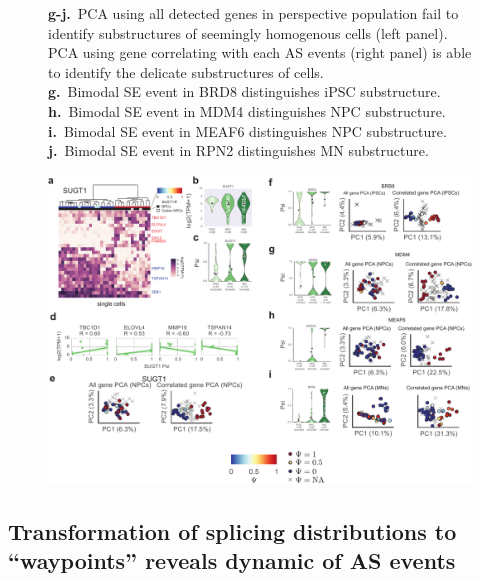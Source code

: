 \begin{figure}[h]
{\textbf{g-j.}~PCA using all detected genes in perspective population fail to identify substructures of seemingly homogenous cells (left panel). PCA using gene correlating with each AS events (right panel) is able to identify the delicate substructures of cells.\\
\textbf{g.}~Bimodal SE event in BRD8 distinguishes iPSC substructure.\\
\textbf{h.}~Bimodal SE event in MDM4 distinguishes NPC substructure.\\
\textbf{i.}~Bimodal SE event in MEAF6 distinguishes NPC substructure.\\
\textbf{j.}~Bimodal SE event in RPN2 distinguishes MN substructure.\\
}
\label{fig:hidden_cell_states_supplementary_part2}

\end{figure}
\clearpage
\begin{figure}[h]
\ContinuedFloat
\captionsetup{labelformat=empty}
\centering
\includegraphics[width=5.8in]{figures/hidden_cell_states_supplementary_part2.pdf}
\end{figure}
\clearpage


\subsection{Transformation of splicing distributions to ``waypoints'' reveals dynamic of AS events}


